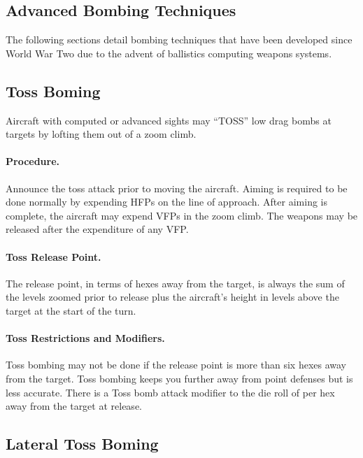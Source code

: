 \begin{advancedrules}
    
\section{Advanced Bombing Techniques}

The following sections detail bombing techniques that have been developed since World War Two due to the advent of ballistics computing weapons systems.

\subsection{Toss Boming}

Aircraft with computed or advanced sights may “TOSS” low drag bombs at targets by lofting them out of a zoom climb.

\paragraph{Procedure.} Announce the toss attack prior to moving the aircraft. Aiming is required to be done normally by expending HFPs on the line of approach. After aiming is complete, the aircraft may expend VFPs in the zoom climb. The weapons may be released after the expenditure of any VFP.

\paragraph{Toss Release Point.} The release point, in terms of hexes away from the target, is always the sum of the levels zoomed prior to release plus the aircraft's height in levels above the target at the start of the turn.

\paragraph{Toss Restrictions and Modifiers.} Toss bombing may not be done if the release point is more than six hexes away from the target. Toss bombing keeps you further away from point defenses but is less accurate. There is a Toss bomb attack modifier to the die roll of  per hex away from the target at release.  

\subsection{Lateral Toss Boming}


\end{advancedrules}
